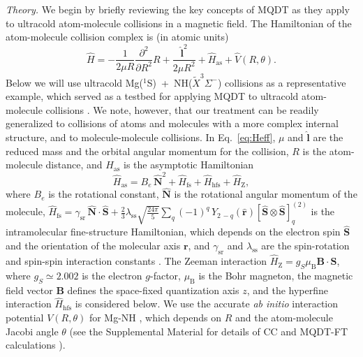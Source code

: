 \documentclass[reprint,amssymb,noeprint,twocolumn,longbibliography]{revtex4-2}
\begin{document}
{\it Theory.} We begin by briefly reviewing the key concepts of MQDT as they apply to ultracold atom-molecule collisions in a magnetic field.
The Hamiltonian of the atom-molecule collision complex is (in atomic units) \cite{Krems_04}
\begin{equation}
{
\hat{H} = - \frac{1}{2\mu R} \frac{\partial^2}{\partial R^2}R + \frac{\hat{\mathbf{l}}^2}{2\mu R^2} +\hat{H}_\text{as} + \hat{V}(R,\theta)
}.
\label{eq:Heff}
\end{equation}
Below we will use ultracold Mg($^1$S)~+~NH($\tilde{X}^3\Sigma^-$) collisions as a representative example, which served as a testbed for applying MQDT to ultracold atom-molecule collisions \cite{Croft_11}. We note, however, that our treatment can be readily generalized to collisions of atoms and molecules with a more complex internal structure, and to molecule-molecule collisions. 
In Eq.~\eqref{eq:Heff}, $\mu$ and $\hat{\mathbf{l}}$ are the reduced mass and the orbital angular momentum for the collision, $R$ is the atom-molecule distance, and  $\hat{H}_\mathrm{as}$ is the asymptotic Hamiltonian
\begin{equation}
\hat{H}_\text{as} = 
B_{e}\,\hat{\mathbf{N}}^2+ \hat{H}_\text{fs} + \hat{H}_\text{hfs}  + \hat{H}_\text{Z},
\label{eq:Has}
\end{equation}
where $B_{e}$ is the rotational constant,  $\hat{\mathbf{N}}$ is the rotational angular momentum of the molecule, $\hat{H}_\text{fs} = \gamma_\mathrm{sr}\,\hat{\mathbf{N}}\cdot\hat{\mathbf{S}}+\frac{2}{3}\lambda_\mathrm{ss}\sqrt{\frac{24\pi}{5}}\sum^{}_{q}(-1)^q\,Y_{2\,-q}(\hat{\bm{r}})[\hat{\mathbf{S}} \otimes \hat{\mathbf{S}}]_q^{(2)}$  is the intramolecular fine-structure Hamiltonian, which depends on the electron spin $\hat{\mathbf{S}}$ 
and the orientation of the molecular axis $\bm{r}$, and $\gamma_\text{sr}$ and $\lambda_\text{ss}$ are the spin-rotation and spin-spin interaction constants \cite{Wallis_09,Maykel_11}.  
The Zeeman interaction $\hat{H}_\text{Z} = g_S \mu_\mathrm{B} \mathbf{B}\cdot \hat{\mathbf{S}}$, where $g_S \simeq 2.002$ is the electron $g$-factor, $\mu_\mathrm{B}$ is the Bohr magneton, the magnetic field vector $\mathbf{B}$ defines the space-fixed quantization axis $z$, and the hyperfine interaction $ \hat{H}_\text{hfs}  $ is considered below. 
We use the accurate {\it ab initio} interaction potential $V(R,\theta)$ for Mg-NH \cite{MOLSCAT}, which depends on $R$ and the atom-molecule Jacobi angle $\theta$  (see the Supplemental Material for details of CC and MQDT-FT calculations \cite{SM}).
\end{document}
